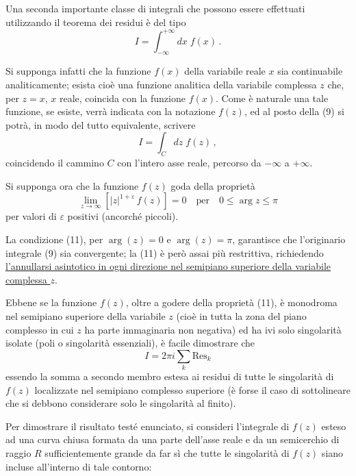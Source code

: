 \documentclass[11pt, a4paper]{book}
\numberwithin{equation}{section}
\begin{document}
Una seconda importante classe di integrali che possono essere effettuati utilizzando il teorema dei residui è del tipo
\begin{equation}
I = \int_{-\infty}^{+\infty} dx\; f(x)\,. \tag{9}
\end{equation}

Si supponga infatti che la funzione $f(x)$ della variabile reale $x$ sia continuabile analiticamente; esista cioè una funzione analitica della variabile complessa $z$ che, per $z = x$, $x$ reale, coincida con la funzione $f(x)$. Come è naturale una tale funzione, se esiste, verrà indicata con la notazione%
$f(z)$, ed al posto della (9) si potrà, in modo del tutto equivalente, scrivere
\begin{equation}
I = \int_C dz\; f(z)\,, \tag{10}
\end{equation}
coincidendo il cammino $C$ con l'intero asse reale, percorso da $-\infty$ a $+\infty$.

Si supponga ora che la funzione $f(z)$ goda della proprietà
\begin{equation}
\lim_{z \to \infty} \left[|z|^{1+\varepsilon}\,f(z)\right] = 0 \quad \text{per} \quad 0 \leq \arg z \leq \pi \tag{11}
\end{equation}
per valori di $\varepsilon$ positivi (ancorché piccoli).

La condizione (11), per $\arg(z)=0$ e $\arg(z)=\pi$, garantisce che l'originario integrale (9) sia convergente; la (11) è però assai più restrittiva, richiedendo \uline{l'annullarsi asintotico in ogni direzione nel semipiano superiore della variabile complessa $z$}.

Ebbene se la funzione $f(z)$, oltre a godere della proprietà (11), è monodroma nel semipiano superiore della variabile $z$ (cioè in tutta la zona del piano complesso in cui $z$ ha parte immaginaria non negativa) ed ha ivi solo singolarità isolate (poli o singolarità essenziali), è facile dimostrare che
\begin{equation}
I = 2\pi i \sum_k \mathrm{Res}_k \tag{12}
\end{equation}
essendo la somma a secondo membro estesa ai residui di tutte le singolarità di $f(z)$ localizzate nel semipiano complesso superiore (è forse il caso di sottolineare che si debbono considerare solo le singolarità al finito).

Per dimostrare il risultato testé enunciato, si consideri l'integrale di $f(z)$ esteso ad una curva chiusa formata da una parte dell'asse reale e da un semicerchio di raggio $R$ sufficientemente grande da far sì che tutte le singolarità di $f(z)$ siano incluse all'interno di tale contorno:
\end{document}
